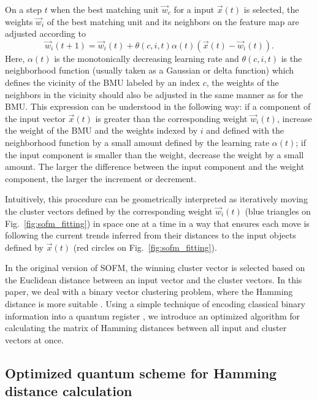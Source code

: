 \documentclass[pra,showkeys,twocolumn,showpacs,aps,10pt]{revtex4-1}
\begin{document}
On a step $t$ when the best matching unit $\vec{w}_{c}$ for a input $\vec{x}(t)$ is selected,
the weights $\vec{w}_{i}$ of the best matching unit and its neighbors on the feature map are adjusted according to
%
\begin{equation}
    \label{eq:learning}
  \vec{w}_{i}(t + 1)
  = \vec{w}_{i}(t)
  + \theta(c, i, t) \alpha(t)
    \left(\vec{x}(t) - \vec{w}_{i}(t)\right) .
\end{equation}
%
Here,  $\alpha(t)$ is the monotonically decreasing learning rate and $\theta(c, i, t)$ is the neighborhood function (usually taken as a Gaussian or delta function) which defines the vicinity of the BMU labeled by an index $c$, the weights of the neighbors in the vicinity should also be adjusted in the same manner as for the BMU. This expression can be understood in the following way: if a component of the input vector $\vec{x}(t)$ is greater than the corresponding weight $ \vec{w}_{i}(t) $, increase the weight of the BMU and the weights indexed by $i$ and defined with the neighborhood function by a small amount defined by the learning rate $\alpha(t)$; if the input component is smaller than the weight, decrease the weight by a small amount. The larger the difference between the input component and the weight component, the larger the increment or decrement.

Intuitively, this procedure can be geometrically interpreted as iteratively moving the cluster vectors defined by the corresponding weight $ \vec{w}_{i}(t) $ (blue triangles on Fig.~\ref{fig:sofm_fitting}) in space one at a time in a way that ensures each move is following the current trends inferred from their distances to the input objects defined by $\vec{x}(t)$ (red circles on Fig.~\ref{fig:sofm_fitting}).

In the original version of SOFM, the winning cluster vector is selected based on the Euclidean distance between an input vector and the cluster vectors. In this paper, we deal with a binary vector clustering problem, where the Hamming distance is more suitable \cite{appiah2009, santana2017}.
Using a simple technique of encoding classical binary information into a quantum register \cite{trugenberger2001},
we introduce an optimized algorithm for calculating the matrix of Hamming distances between all input and cluster vectors at once.


\subsection{Optimized quantum scheme for Hamming distance calculation}
\label{subsec:qcircuit}
\end{document}

